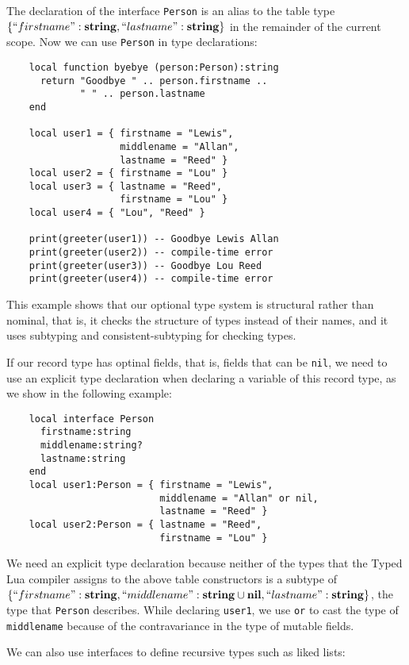 The declaration of the interface \texttt{Person} is an alias to the table type
$\{``firstname":\mathbf{string}, ``lastname":\mathbf{string}\}$ in the remainder
of the current scope.
Now we can use \texttt{Person} in type declarations:
\begin{verbatim}
    local function byebye (person:Person):string
      return "Goodbye " .. person.firstname ..
             " " .. person.lastname
    end

    local user1 = { firstname = "Lewis",
                    middlename = "Allan",
                    lastname = "Reed" }
    local user2 = { firstname = "Lou" }
    local user3 = { lastname = "Reed",
                    firstname = "Lou" }
    local user4 = { "Lou", "Reed" }

    print(greeter(user1)) -- Goodbye Lewis Allan
    print(greeter(user2)) -- compile-time error
    print(greeter(user3)) -- Goodbye Lou Reed
    print(greeter(user4)) -- compile-time error
\end{verbatim}

This example shows that our optional type system is structural rather
than nominal, that is, it checks the structure of types instead of
their names, and it uses subtyping and consistent-subtyping for
checking types.

If our record type has optinal fields, that is, fields that can be \texttt{nil},
we need to use an explicit type declaration when declaring a
variable of this record type, as we show in the following example:
\begin{verbatim}
    local interface Person
      firstname:string
      middlename:string?
      lastname:string
    end
    local user1:Person = { firstname = "Lewis",
                           middlename = "Allan" or nil,
                           lastname = "Reed" }
    local user2:Person = { lastname = "Reed",
                           firstname = "Lou" }
\end{verbatim}

We need an explicit type declaration because neither of the types
that the Typed Lua compiler assigns to the above table constructors
is a subtype of
$\{``firstname":\mathbf{string}, ``middlename":\mathbf{string}\cup\mathbf{nil}, ``lastname":\mathbf{string}\}$,
the type that \texttt{Person} describes.
While declaring \texttt{user1}, we use \texttt{or} to cast the type of
\texttt{middlename} because of the contravariance in the type of
mutable fields.

We can also use interfaces to define recursive types such as liked lists:

